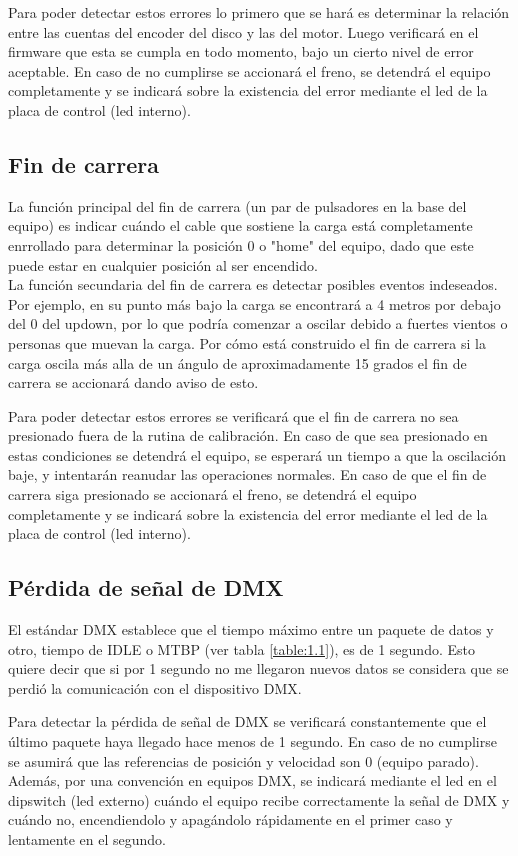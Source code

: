 Para poder detectar estos errores lo primero que se hará es determinar la relación entre las cuentas del encoder del disco y las del motor. Luego verificará en el firmware que esta se cumpla en todo momento, bajo un cierto nivel de error aceptable. En caso de no cumplirse se accionará el freno, se detendrá el equipo completamente y se indicará sobre la existencia del error mediante el led de la placa de control (led interno).

\subsection{Fin de carrera}
La función principal del fin de carrera (un par de pulsadores en la base del equipo) es indicar cuándo el cable que sostiene la carga está completamente enrrollado para determinar la posición 0 o "home" del equipo, dado que este puede estar en cualquier posición al ser encendido.\\
La función secundaria del fin de carrera es detectar posibles eventos indeseados. Por ejemplo, en su punto más bajo la carga se encontrará a 4 metros por debajo del 0 del updown, por lo que podría comenzar a oscilar debido a fuertes vientos o personas que muevan la carga. Por cómo está construido el fin de carrera si la carga oscila más alla de un ángulo de aproximadamente 15 grados el fin de carrera se accionará dando aviso de esto.

Para poder detectar estos errores se verificará que el fin de carrera no sea presionado fuera de la rutina de calibración. En caso de que sea presionado en estas condiciones se detendrá el equipo, se esperará un tiempo a que la oscilación baje, y intentarán reanudar las operaciones normales. En caso de que el fin de carrera siga presionado se accionará el freno, se detendrá el equipo completamente y se indicará sobre la existencia del error mediante el led de la placa de control (led interno).


\subsection{Pérdida de señal de DMX}
El estándar DMX establece que el tiempo máximo entre un paquete de datos y otro, tiempo de IDLE o MTBP (ver tabla \ref{table:1.1}), es de 1 segundo. Esto quiere decir que si por 1 segundo no me llegaron nuevos datos se considera que se perdió la comunicación con el dispositivo DMX.

Para detectar la pérdida de señal de DMX se verificará constantemente que el último paquete haya llegado hace menos de 1 segundo. En caso de no cumplirse se asumirá que las referencias de posición y velocidad son 0 (equipo parado). Además, por una convención en equipos DMX, se indicará mediante el led en el dipswitch (led externo) cuándo el equipo recibe correctamente la señal de DMX y cuándo no, encendiendolo y apagándolo rápidamente en el primer caso y lentamente en el segundo.


